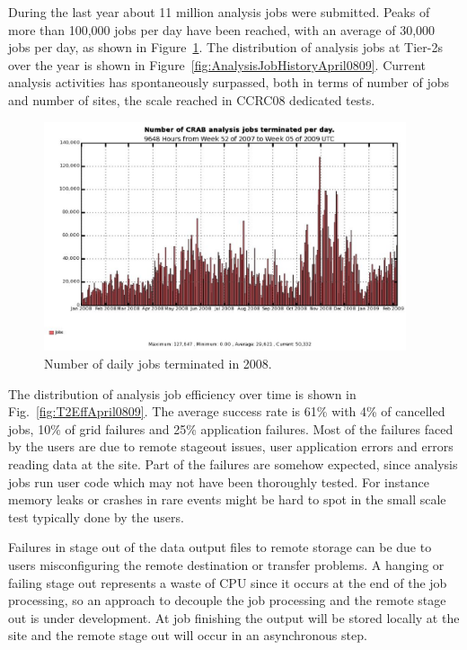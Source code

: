 During the last year about 11 million analysis jobs were submitted.  Peaks
of more than 100,000 jobs per day have been reached, with an average
of 30,000 jobs per day, as shown in Figure~\ref{fig:jobs}.
The distribution of analysis jobs at Tier-2s over the year is shown in Figure~\ref{fig:AnalysisJobHistoryApril0809}. Current analysis activities has spontaneously surpassed, both in terms of number of jobs and number of sites, the scale reached in CCRC08 dedicated tests. 
\begin{figure}
\includegraphics[width=0.95\textwidth]{crabjobsdaily.eps}
\caption{Number of daily jobs terminated in 2008. }
\label{fig:jobs}
\end{figure}

The distribution of analysis job efficiency over time is shown in Fig.~\ref{fig:T2EffApril0809}. The average success rate is 61\% with 4\% of cancelled jobs, 10\% of grid failures and 25\% application failures.
Most of the failures faced by the users are due to remote stageout issues, user application errors and errors reading data at the site. 
Part of the failures are somehow expected, since analysis jobs run user code which may not have been thoroughly tested. For instance memory leaks or crashes in rare events might be hard to spot in the small scale test typically done by the users.

Failures in stage out of the data output files to remote storage can be due 
to users misconfiguring the remote destination or transfer problems.
A hanging or failing stage out represents a waste of CPU since it occurs at 
the end of the job processing, so an approach to decouple the job processing and the remote stage out is under development. At job finishing the output will be stored locally at the site and the remote stage out will occur in an asynchronous step.

